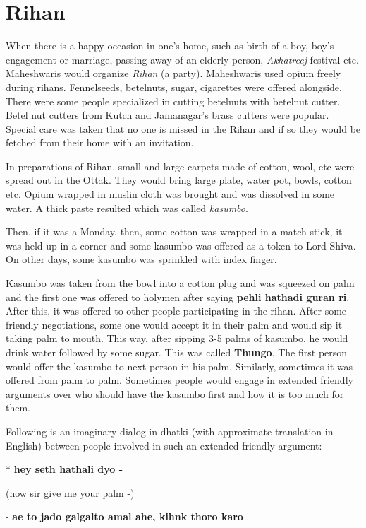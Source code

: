\chapter{Rihan}
When there is a happy occasion in one's home, such as birth of a boy, boy's
engagement or marriage, passing away of an elderly person, \textit{Akhatreej}
festival etc. Maheshwaris would organize \textit{Rihan} (a party). Maheshwaris
used opium freely during rihans. Fennelseeds, betelnuts, sugar, cigarettes were
offered alongside. There were some people specialized in cutting betelnuts with
betelnut cutter. Betel nut cutters from Kutch and Jamanagar's brass cutters
were popular. Special care was taken that no one is missed in the Rihan and if
so they would be fetched from their home with an invitation.

In preparations of Rihan, small and large carpets made of cotton, wool, etc
were spread out in the Ottak. They would bring large plate, water pot, bowls,
cotton etc. Opium wrapped in muslin cloth was brought and was dissolved in some
water. A thick paste resulted which was called \textit{kasumbo}.

Then, if it was a Monday, then, some cotton was wrapped in a match-stick, it
was held up in a corner and some kasumbo was offered as a token to Lord Shiva.
On other days, some kasumbo was sprinkled with index finger.

Kasumbo was taken from the bowl into a cotton plug and was squeezed on palm and
the first one was offered to holymen after saying \textbf{pehli hathadi guran
ri}. After this, it was offered to other people participating in the rihan.
After some friendly negotiations, some one would accept it in their palm and
would sip it taking palm to mouth. This way, after sipping 3-5 palms of
kasumbo, he would drink water followed by some sugar. This was called
\textbf{Thungo}. The first person would offer the kasumbo to next person in his
palm. Similarly, sometimes it was offered from palm to palm. Sometimes people
would engage in extended friendly arguments over who should have the kasumbo
first and how it is too much for them.

Following is an imaginary dialog in dhatki (with approximate translation in
English) between people involved in such an extended friendly argument:

* \textbf{hey seth hathali dyo -}

(now sir give me your palm -)

- \textbf{ae to jado galgalto amal ahe, kihnk thoro karo}

